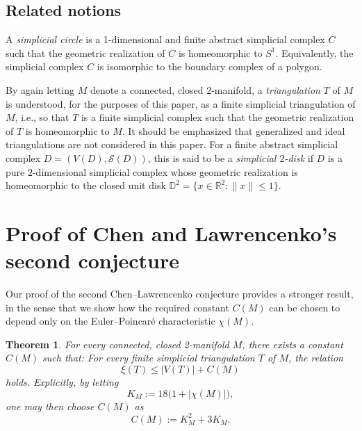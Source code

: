 \documentclass[12pt]{article}
\newtheorem{theorem}{Theorem}
\begin{document}
\subsection{Related notions}
 A \emph{simplicial circle} is a 1-dimensional and finite abstract simplicial complex $C$ such that the geometric
 realization of $C$ is homeomorphic to $S^1$. Equivalently, the simplicial complex $C$ is isomorphic to the 
 boundary complex of a polygon. 

 By again letting $M$ denote a connected, closed 2-manifold, a 
 \emph{triangulation} $T$ of $M$
 is understood, for the purposes of this paper, as a finite simplicial triangulation of $M$, i.e., 
 so that $T$
 is a finite simplicial complex such that the geometric realization of $T$ is homeomorphic to $M$. 
 It should be emphasized that generalized and ideal triangulations are not considered in this paper. 
 For a finite abstract simplicial complex $D = (V(D), \mathcal{S}(D))$, 
 this is said to be a \emph{simplicial $2$-disk} if $D$ is a pure $2$-dimensional simplicial complex whose geometric realization is 
 homeomorphic to the closed unit disk 
 $\mathbb{D}^{2} = \{ x \in \mathbb{R}^{2} : \| x \| \leq 1 \}$. 

\section{Proof of Chen and Lawrencenko's second conjecture}\label{secproof}
 Our proof of the second Chen--Lawrencenko conjecture \cite[Conjecture 2]{ChenLawrencenko1999} provides a 
 stronger result, in the sense that we show how the required constant $C(M)$ 
 can be chosen to depend only on the Euler--Poincar\'{e} characteristic $\chi(M)$. 

\begin{theorem}\label{firstsolution}
 For every connected, closed 2-manifold $M$, 
 there exists a constant $C(M)$ such that: For every finite simplicial triangulation $T$ of $M$, 
 the relation 
\begin{equation}\label{equivalentconj}
 \xi(T) \leq \left| V(T) \right| + C(M) 
\end{equation}
 holds. Explicitly, by letting 
 \begin{equation}\label{defineKM}
 K_{M} := 18 \big( 1 + |\chi(M)| \big), 
\end{equation}
 one may then choose $C(M)$ as 
\begin{equation}\label{defineCM} 
 C(M) := K_{M}^{2} + 3 K_{M}. 
\end{equation} 
\end{theorem}
\end{document}
